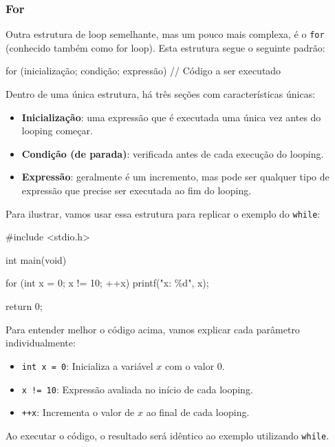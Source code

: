 \subsubsection{For}

Outra estrutura de loop semelhante, mas um pouco mais complexa, é o 
\texttt{for} (conhecido também como for loop). Esta estrutura segue o seguinte padrão:

\begin{excode}
    for (inicialização; condição; expressão) {
        // Código a ser executado
    }
\end{excode}

Dentro de uma única estrutura, há três seções com características únicas:

\begin{itemize}
    \item \textbf{Inicialização}: uma expressão que é executada uma única vez 
        antes do looping começar.
    \item \textbf{Condição (de parada)}: verificada antes de cada execução do 
        looping.
    \item \textbf{Expressão}: geralmente é um incremento, mas pode ser qualquer 
        tipo de expressão que precise ser executada ao fim do looping.
\end{itemize}

Para ilustrar, vamos usar essa estrutura para replicar o exemplo do \texttt{while}:

\begin{excode}
    #include <stdio.h>

    int main(void)
    {
        for (int x = 0; x != 10; ++x) {
            printf("x: \%d\n", x);
        }

        return 0;
    }
\end{excode}

Para entender melhor o código acima, vamos explicar cada parâmetro 
individualmente:

\begin{itemize}
    \item \texttt{int x = 0}: Inicializa a variável \(x\) com o valor 0.
    \item \texttt{x != 10}: Expressão avaliada no início de cada looping.
    \item \texttt{++x}: Incrementa o valor de \(x\) ao final de cada looping.
\end{itemize}


Ao executar o código, o resultado será idêntico ao exemplo utilizando 
\texttt{while}.


